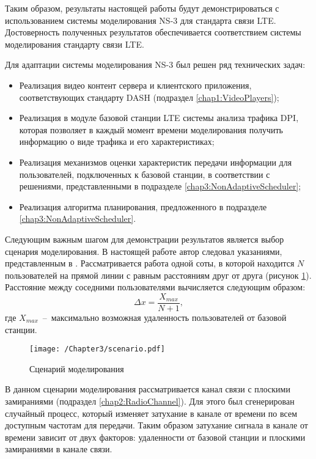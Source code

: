 Таким образом, результаты настоящей работы будут демонстрироваться с использованием системы моделирования NS-3 для стандарта связи LTE. Достоверность полученных результатов обеспечивается соответствием системы моделирования стандарту связи LTE.

Для адаптации системы моделирования NS-3 был решен ряд технических задач:
\begin{itemize}
	\item Реализация видео контент сервера и клиентского приложения, соответствующих стандарту DASH (подраздел \ref{chap1:VideoPlayers});
	\item Реализация в модуле базовой станции LTE системы анализа трафика DPI, которая позволяет в каждый момент времени моделирования получить информацию о виде трафика и его характеристиках;
	\item Реализация механизмов оценки характеристик передачи информации для пользователей, подключенных к базовой станции, в соответствии с решениями, представленными в подразделе \ref{chap3:NonAdaptiveScheduler};
	\item Реализация алгоритма планирования, предложенного в подразделе \ref{chap3:NonAdaptiveScheduler}.
\end{itemize}

Следующим важным шагом для демонстрации результатов является выбор сценария моделирования. В настоящей работе автор следовал указаниями, представленным в \cite{simulation}. Рассматривается работа одной соты, в которой находится $N$ пользователей на прямой линии с равным расстояниям друг от друга (рисунок \ref{fig:scenario}). Расстояние между соседними пользователями вычисляется следующим образом:
$$\Delta x = \frac{X_{max}}{N+1},$$
где $X_{max}$~--~максимально возможная удаленность пользователей от базовой станции.

\begin{figure}[htbp]
\begin{center}
\texttt{[image: /Chapter3/scenario.pdf]}
\caption{Сценарий моделирования}
\label{fig:scenario}
\end{center}
\end{figure}

В данном сценарии моделирования рассматривается канал связи с плоскими замираниями (подраздел \ref{chap2:RadioChannel}). Для этого был сгенерирован случайный процесс, который изменяет затухание в канале от времени по всем доступным частотам для передачи. Таким образом затухание сигнала в канале от времени зависит от двух факторов: удаленности от базовой станции и плоскими замираниями в канале связи.

